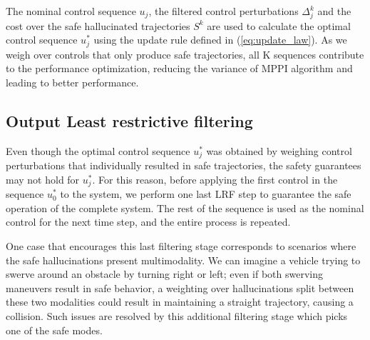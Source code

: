 The nominal control sequence $u_j$, the filtered control perturbations $\Delta_j^k$ and the cost over the safe hallucinated trajectories $S^k$ are used to calculate the optimal control sequence $u^*_j$ using the update rule defined in (\ref{eq:update_law}). As we weigh over controls that only produce safe trajectories, all K sequences contribute to the performance optimization, reducing the variance of MPPI algorithm and leading to better performance.

\subsection{\label{output_filter}Output Least restrictive filtering}

Even though the optimal control sequence $u^*_j$ was obtained by weighing control perturbations that individually resulted in safe trajectories, the safety guarantees may not hold for $u_j^*$. For this reason, before applying the first control in the sequence $u^*_0$ to the system, we perform one last LRF step to guarantee the safe operation of the complete system. The rest of the sequence is used as the nominal control for the next time step, and the entire process is repeated.

One case that encourages this last filtering stage corresponds to scenarios where the safe hallucinations present multimodality. We can imagine a vehicle trying to swerve around an obstacle by turning right or left; even if both swerving maneuvers result in safe behavior, a weighting over hallucinations split between these two modalities could result in maintaining a straight trajectory, causing a collision. Such issues are resolved by this additional filtering stage which picks one of the safe modes.


